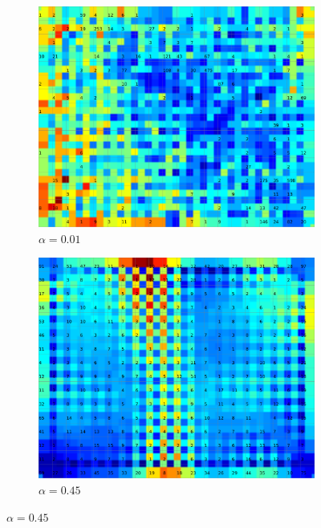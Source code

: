 \documentclass{acm_proc_article-sp}
\begin{document}
\begin{figure}
\centering
    \centering
    \begin{subfigure}[b]{0.24\linewidth}
        \includegraphics[width=\linewidth]{img/wine-20x16-u-matrix-alpha-0,01}
        \caption{$\alpha=0.01$}
        \label{fig:wine-20x16-u-matrix-alpha-0,01}
    \end{subfigure}
    \begin{subfigure}[b]{0.24\linewidth}
        \includegraphics[width=\linewidth]{img/wine-20x16-u-matrix-alpha-0,45}
        \caption{$\alpha=0.45$}
        \label{fig:wine-20x16-u-matrix-alpha-0,45}

\end{subfigure}
\end{figure}
\end{document}
